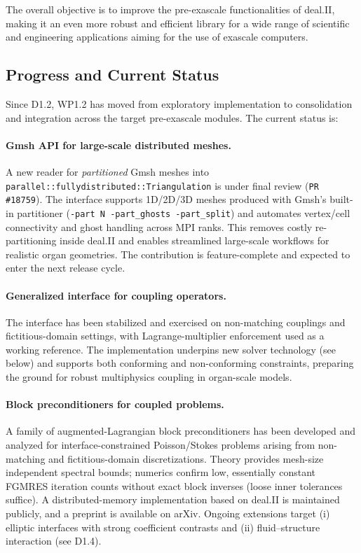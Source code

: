 \documentclass[a4paper,12pt]{article}
\begin{document}
The overall objective is to improve the pre-exascale functionalities of deal.II,
making it an even more robust and efficient library for a wide range of
scientific and engineering applications aiming for the use of exascale
computers.

\subsection{Progress and Current Status}

Since D1.2, WP1.2 has moved from exploratory implementation to consolidation and
integration across the target pre-exascale modules. The current status is:

\paragraph{Gmsh API for large-scale distributed meshes.}
A new reader for \emph{partitioned} Gmsh meshes into
\texttt{parallel::fullydistributed::Triangulation} is under final review
(\texttt{PR \#18759}). The interface supports 1D/2D/3D meshes produced with
Gmsh's built-in partitioner (\verb|-part N -part_ghosts -part_split|) and
automates vertex/cell connectivity and ghost handling across MPI ranks. This
removes costly re-partitioning inside deal.II and enables streamlined
large-scale workflows for realistic organ geometries. The contribution is
feature-complete and expected to enter the next release cycle.

\paragraph{Generalized interface for coupling operators.}
The interface has been stabilized and exercised on non-matching couplings and
fictitious-domain settings, with Lagrange-multiplier enforcement used as a
working reference. The implementation underpins new solver technology (see
below) and supports both conforming and non-conforming constraints, preparing
the ground for robust multiphysics coupling in organ-scale models.

\paragraph{Block preconditioners for coupled problems.}
A family of augmented-Lagrangian block preconditioners has been developed and
analyzed for interface-constrained Poisson/Stokes problems arising from
non-matching and fictitious-domain discretizations. Theory provides mesh-size
independent spectral bounds; numerics confirm low, essentially constant FGMRES
iteration counts without exact block inverses (loose inner tolerances suffice).
A distributed-memory implementation based on deal.II is maintained publicly, and
a preprint is available on arXiv. Ongoing extensions target (i) elliptic
interfaces with strong coefficient contrasts and (ii) fluid–structure
interaction (see D1.4).
\end{document}
